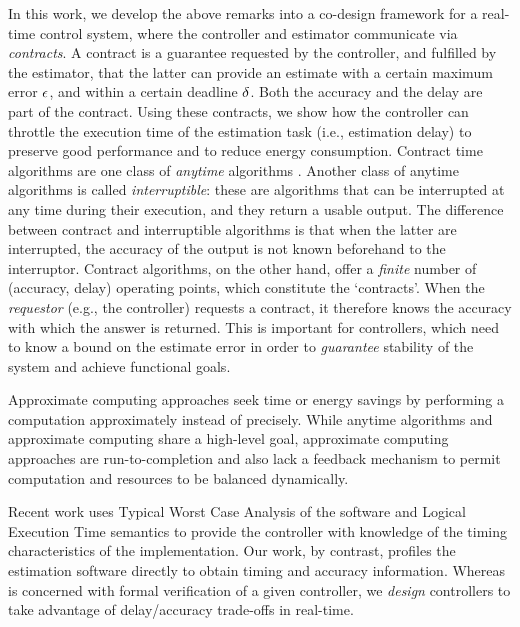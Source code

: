 

In this work, we develop the above remarks into a co-design framework for a real-time control system, where the controller and estimator communicate via \emph{contracts}.
A contract is a guarantee requested by the controller, and fulfilled by the estimator, that the latter can provide an estimate with a certain maximum error $\epsilon$, and within a certain deadline $\delta$.
Both the accuracy and the delay are part of the contract.
Using these contracts, we show how the controller can throttle the execution time of the estimation task (i.e., estimation delay) to preserve good performance and to reduce energy consumption.
Contract time algorithms \cite{zilbersteinAImag} are one class of \emph{anytime} algorithms \cite{boddy}. %
Another class of anytime algorithms is called \emph{interruptible}: these are algorithms that can be interrupted at any time during their execution, and they return a usable output.
The difference between contract and interruptible algorithms is that when the latter are interrupted, the accuracy of the output is not known beforehand to the interruptor.
Contract algorithms, on the other hand, offer a \emph{finite} number of (accuracy, delay) operating points, which constitute the `contracts'. 
When the \emph{requestor} (e.g., the controller) requests a contract, it therefore knows the accuracy with which the answer is returned.
This is important for controllers, which need to know a bound on the estimate error in order to \emph{guarantee} stability of the system and achieve functional goals.

Approximate computing approaches \cite{loop-perf,rely,npu} seek time or energy
savings by performing a computation approximately instead of precisely. While
anytime algorithms and approximate computing share a high-level goal,
approximate computing approaches are run-to-completion and also lack a feedback
mechanism to permit computation and resources to be balanced dynamically.

Recent work \cite{FrehseHQW14_Formal} uses Typical Worst Case Analysis of the software and Logical Execution Time semantics to provide the controller with knowledge of the timing characteristics of the implementation.
Our work, by contrast, profiles the estimation software directly to obtain timing and accuracy information. 
Whereas \cite{FrehseHQW14_Formal} is concerned with formal verification of a given controller, we \emph{design} controllers to take advantage of delay/accuracy trade-offs in real-time.

